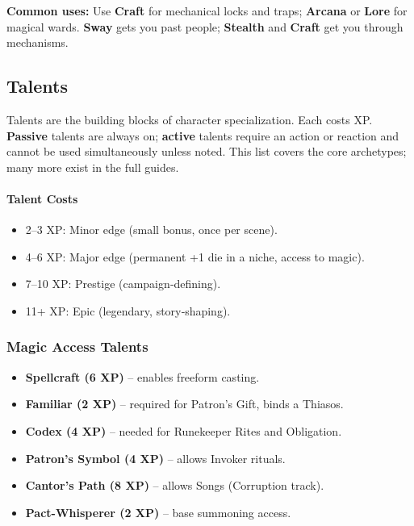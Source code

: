 \noindent
\textbf{Common uses:} Use \textbf{Craft} for mechanical locks and traps; \textbf{Arcana} or \textbf{Lore} for magical wards. \textbf{Sway} gets you past people; \textbf{Stealth} and \textbf{Craft} get you through mechanisms.

\subsection{Talents}

Talents are the building blocks of character specialization. Each costs XP. \textbf{Passive} talents are always on; \textbf{active} talents require an action or reaction and cannot be used simultaneously unless noted. This list covers the core archetypes; many more exist in the full guides.

\paragraph{Talent Costs}
\begin{itemize}
  \item 2–3 XP: Minor edge (small bonus, once per scene).
  \item 4–6 XP: Major edge (permanent +1 die in a niche, access to magic).
  \item 7–10 XP: Prestige (campaign‑defining).
  \item 11+ XP: Epic (legendary, story‑shaping).
\end{itemize}

\subsubsection*{Magic Access Talents}
\begin{itemize}
  \item \textbf{Spellcraft (6 XP)} – enables freeform casting.
  \item \textbf{Familiar (2 XP)} – required for Patron's Gift, binds a Thiasos.
  \item \textbf{Codex (4 XP)} – needed for Runekeeper Rites and Obligation.
  \item \textbf{Patron's Symbol (4 XP)} – allows Invoker rituals.
  \item \textbf{Cantor's Path (8 XP)} – allows Songs (Corruption track).
  \item \textbf{Pact-Whisperer (2 XP)} – base summoning access.
\end{itemize}

